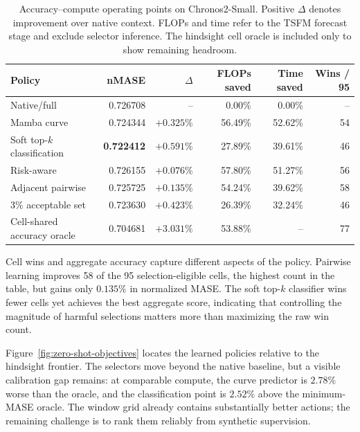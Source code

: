 \begin{table}[t]
    \centering
    \footnotesize
    \setlength{\tabcolsep}{5pt}
    \caption{Accuracy--compute operating points on Chronos2-Small.  Positive
    $\Delta$ denotes improvement over native context.  FLOPs and time refer to
    the TSFM forecast stage and exclude selector inference.  The hindsight cell
    oracle is included only to show remaining headroom.}
    \label{tab:zero-shot-objectives}
    \begin{tabular}{lrrrrr}
        \toprule
        Policy & nMASE & $\Delta$ & FLOPs saved & Time saved & Wins / 95 \\
        \midrule
        Native/full                    & 0.726708 & --       &  0.00\% &  0.00\% & -- \\
        Mamba curve                    & 0.724344 & $+0.325\%$ & 56.49\% & 52.62\% & 54 \\
        Soft top-$k$ classification    & \textbf{0.722412} & $\mathbf{+0.591\%}$ & 27.89\% & 39.61\% & 46 \\
        Risk-aware                     & 0.726155 & $+0.076\%$ & 57.80\% & 51.27\% & 56 \\
        Adjacent pairwise              & 0.725725 & $+0.135\%$ & 54.24\% & 39.62\% & 58 \\
        $3\%$ acceptable set           & 0.723630 & $+0.423\%$ & 26.39\% & 32.24\% & 46 \\
        \midrule
        Cell-shared accuracy oracle    & 0.704681 & $+3.031\%$ & 53.88\% & -- & 77 \\
        \bottomrule
    \end{tabular}
\end{table}

Cell wins and aggregate accuracy capture different aspects of the policy.
Pairwise learning improves 58 of the 95 selection-eligible cells, the highest
count in the table, but gains only $0.135\%$ in normalized MASE.  The soft
top-$k$ classifier wins fewer cells yet achieves the best aggregate score,
indicating that controlling the magnitude of harmful selections matters more
than maximizing the raw win count.

Figure~\ref{fig:zero-shot-objectives} locates the learned policies relative to
the hindsight frontier.  The selectors move beyond the native baseline, but a
visible calibration gap remains: at comparable compute, the curve predictor is
$2.78\%$ worse than the oracle, and the classification point is $2.52\%$ above
the minimum-MASE oracle.  The window grid already contains substantially better
actions; the remaining challenge is to rank them reliably from synthetic
supervision.

